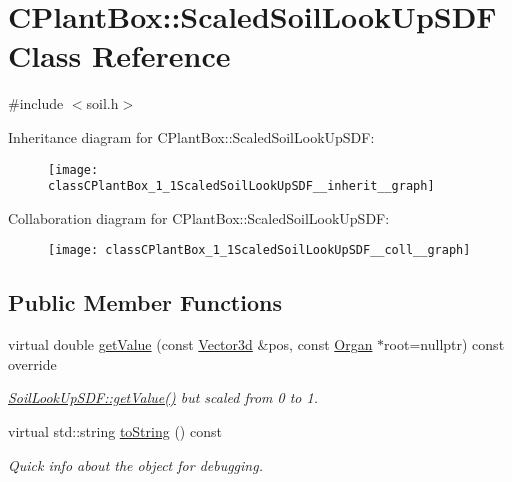 \hypertarget{classCPlantBox_1_1ScaledSoilLookUpSDF}{}\section{C\+Plant\+Box\+:\+:Scaled\+Soil\+Look\+Up\+S\+DF Class Reference}
\label{classCPlantBox_1_1ScaledSoilLookUpSDF}


{\ttfamily \#include $<$soil.\+h$>$}



Inheritance diagram for C\+Plant\+Box\+:\+:Scaled\+Soil\+Look\+Up\+S\+DF\+:\nopagebreak
\begin{figure}[H]
\begin{center}
\leavevmode
\texttt{[image: classCPlantBox\_1\_1ScaledSoilLookUpSDF\_\_inherit\_\_graph]}
\end{center}
\end{figure}


Collaboration diagram for C\+Plant\+Box\+:\+:Scaled\+Soil\+Look\+Up\+S\+DF\+:\nopagebreak
\begin{figure}[H]
\begin{center}
\leavevmode
\texttt{[image: classCPlantBox\_1\_1ScaledSoilLookUpSDF\_\_coll\_\_graph]}
\end{center}
\end{figure}
\subsection*{Public Member Functions}
\begin{DoxyCompactItemize}
\item 
\mbox{\label{classCPlantBox_1_1ScaledSoilLookUpSDF_a3afdf16c07ae27a10602c74a9fac49b9}} 
virtual double \hyperlink{classCPlantBox_1_1ScaledSoilLookUpSDF_a3afdf16c07ae27a10602c74a9fac49b9}{get\+Value} (const \hyperlink{classCPlantBox_1_1Vector3d}{Vector3d} \&pos, const \hyperlink{classCPlantBox_1_1Organ}{Organ} $\ast$root=nullptr) const override
\begin{DoxyCompactList}\small\item\em \hyperlink{classCPlantBox_1_1SoilLookUpSDF_a0382e425fc19f70dcc3309db991ef8f5}{Soil\+Look\+Up\+S\+D\+F\+::get\+Value()} but scaled from 0 to 1. \end{DoxyCompactList}\item 
\mbox{\label{classCPlantBox_1_1ScaledSoilLookUpSDF_ade5386a8c9cf8a3375ba30804acb597e}} 
virtual std\+::string \hyperlink{classCPlantBox_1_1ScaledSoilLookUpSDF_ade5386a8c9cf8a3375ba30804acb597e}{to\+String} () const
\begin{DoxyCompactList}\small\item\em Quick info about the object for debugging. \end{DoxyCompactList}\end{DoxyCompactItemize}
